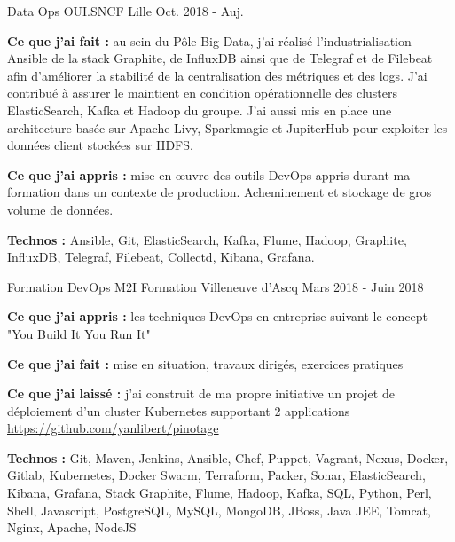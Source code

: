 

\begin{cventries}

  \cventry
    {Data Ops} %
    {OUI.SNCF} %
    {Lille} %
    {Oct. 2018 - Auj.} %
    {
      \begin{cvitems} %
        \item {\textbf{Ce que j'ai fait :} au sein du Pôle Big Data, j'ai réalisé l'industrialisation Ansible de la stack Graphite, de InfluxDB ainsi que de Telegraf et de Filebeat afin d'améliorer la stabilité de la centralisation des métriques et des logs. J'ai contribué à assurer le maintient en condition opérationnelle des clusters ElasticSearch, Kafka et Hadoop du groupe. J'ai aussi mis en place une architecture basée sur Apache Livy, Sparkmagic et JupiterHub pour exploiter les données client stockées sur HDFS.}
        \item {\textbf{Ce que j'ai appris :} mise en \oe uvre des outils DevOps appris durant ma formation dans un contexte de production. Acheminement et stockage de gros volume de données.}
        \item {\textbf{Technos :} Ansible, Git, ElasticSearch, Kafka, Flume, Hadoop, Graphite, InfluxDB, Telegraf, Filebeat, Collectd, Kibana, Grafana.}
      \end{cvitems}
    }

  \cventry
    {Formation DevOps} %
    {M2I Formation} %
    {Villeneuve d'Ascq} %
    {Mars 2018 - Juin 2018} %
    {
      \begin{cvitems} %
        \item {\textbf{Ce que j'ai appris :} les techniques DevOps en entreprise suivant le concept "You Build It You Run It"}
        \item {\textbf{Ce que j'ai fait :} mise en situation, travaux dirigés, exercices pratiques}
        \item {\textbf{Ce que j'ai laissé :} j'ai construit de ma propre initiative un projet de déploiement d'un cluster Kubernetes supportant 2 applications \url{https://github.com/yanlibert/pinotage} }
        \item {\textbf{Technos :} Git, Maven, Jenkins, Ansible, Chef, Puppet, Vagrant, Nexus, Docker, Gitlab, Kubernetes, Docker Swarm, Terraform, Packer, Sonar, ElasticSearch, Kibana, Grafana, Stack Graphite, Flume, Hadoop, Kafka, SQL, Python, Perl, Shell, Javascript, PostgreSQL, MySQL, MongoDB, JBoss, Java JEE, Tomcat, Nginx, Apache, NodeJS}
      \end{cvitems}
    }


\end{cventries}
